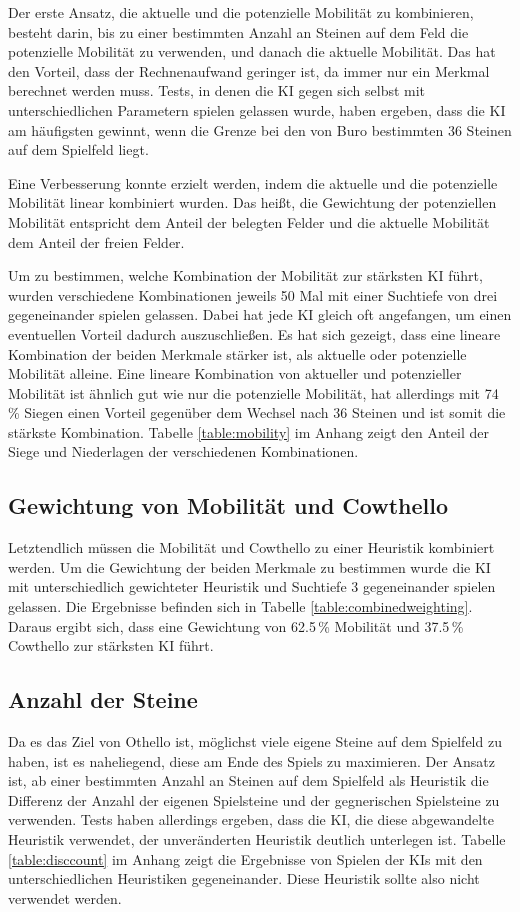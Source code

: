 Der erste Ansatz, die aktuelle und die potenzielle Mobilität zu kombinieren, besteht darin, bis zu einer bestimmten
Anzahl an Steinen auf dem Feld die potenzielle Mobilität zu verwenden, und danach die aktuelle Mobilität. Das hat den
Vorteil, dass der Rechnenaufwand geringer ist, da immer nur ein Merkmal berechnet werden muss. Tests, in denen die KI
gegen sich selbst mit unterschiedlichen Parametern spielen gelassen wurde, haben ergeben, dass die KI am häufigsten
gewinnt, wenn die Grenze bei den von Buro bestimmten 36 Steinen auf dem Spielfeld liegt.

Eine Verbesserung konnte erzielt werden, indem die aktuelle und die potenzielle Mobilität linear kombiniert wurden.
Das heißt, die Gewichtung der potenziellen Mobilität entspricht dem Anteil der belegten Felder und die aktuelle Mobilität
dem Anteil der freien Felder.

Um zu bestimmen, welche Kombination der Mobilität zur stärksten KI führt, wurden verschiedene Kombinationen jeweils 50
Mal mit einer Suchtiefe von drei gegeneinander spielen gelassen. Dabei hat jede KI gleich oft angefangen, um einen
eventuellen Vorteil dadurch auszuschließen. Es hat sich gezeigt, dass eine lineare Kombination der beiden Merkmale
stärker ist, als aktuelle oder potenzielle Mobilität alleine. Eine lineare Kombination von aktueller und potenzieller
Mobilität ist ähnlich gut wie nur die potenzielle Mobilität, hat allerdings mit 74\,\% Siegen einen Vorteil gegenüber
dem Wechsel nach 36 Steinen und ist somit die stärkste Kombination. Tabelle \ref{table:mobility} im Anhang zeigt den
Anteil der Siege und Niederlagen der verschiedenen Kombinationen.

\subsection{Gewichtung von Mobilität und Cowthello} \label{sec:mobcowweight}
Letztendlich müssen die Mobilität und Cowthello zu einer Heuristik kombiniert werden. Um die Gewichtung der beiden
Merkmale zu bestimmen wurde die KI mit unterschiedlich gewichteter Heuristik und Suchtiefe 3 gegeneinander spielen
gelassen. Die Ergebnisse befinden sich in Tabelle \ref{table:combinedweighting}. Daraus ergibt sich, dass eine
Gewichtung von 62.5\,\% Mobilität und 37.5\,\% Cowthello zur stärksten KI führt.

\subsection{Anzahl der Steine}
Da es das Ziel von Othello ist, möglichst viele eigene Steine auf dem Spielfeld zu haben, ist es naheliegend, diese am
Ende des Spiels zu maximieren. Der Ansatz ist, ab einer bestimmten Anzahl an Steinen auf dem Spielfeld als Heuristik die
Differenz der Anzahl der eigenen Spielsteine und der gegnerischen Spielsteine zu verwenden. Tests haben allerdings
ergeben, dass die KI, die diese abgewandelte Heuristik verwendet, der unveränderten Heuristik deutlich unterlegen ist.
Tabelle \ref{table:disccount} im Anhang zeigt die Ergebnisse von Spielen der KIs mit den unterschiedlichen Heuristiken
gegeneinander. Diese Heuristik sollte also nicht verwendet werden.
